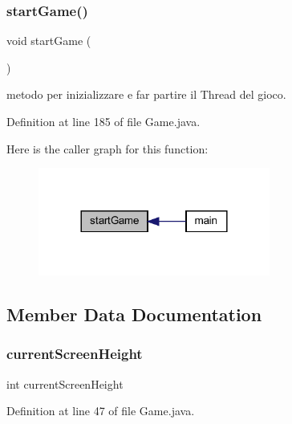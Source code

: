 \subsubsection{\texorpdfstring{start\+Game()}{startGame()}}
{\footnotesize\ttfamily void start\+Game (\begin{DoxyParamCaption}{ }\end{DoxyParamCaption})\hspace{0.3cm}{\ttfamily [private]}}



metodo per inizializzare e far partire il Thread del gioco. 



Definition at line 185 of file Game.\+java.

Here is the caller graph for this function\+:\nopagebreak
\begin{figure}[H]
\begin{center}
\leavevmode
\includegraphics[width=216pt]{classprogetto_1_1_game_ab1f321a2f17fa8ba0f5ab4e2621fd6d6_icgraph}
\end{center}
\end{figure}


\subsection{Member Data Documentation}
\mbox{\label{classprogetto_1_1_game_a1aca3161d2e02e5dc13bb3cae83a8ad1}} 
\subsubsection{\texorpdfstring{current\+Screen\+Height}{currentScreenHeight}}
{\footnotesize\ttfamily int current\+Screen\+Height\hspace{0.3cm}{\ttfamily [static]}}



Definition at line 47 of file Game.\+java.

